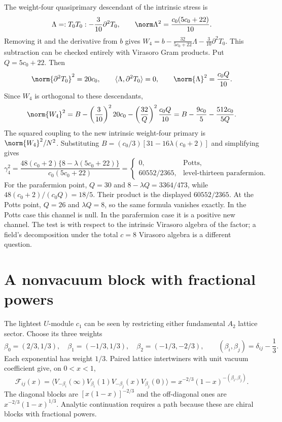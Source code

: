 The weight-four quasiprimary descendant of the intrinsic stress is
\[
 \Lambda=:T_0T_0:-\frac3{10}\partial^2T_0,
 \qquad \norm\Lambda^2=\frac{c_0(5c_0+22)}{10}.
\]
Removing it and the derivative from $b$ gives
$W_4=b-\frac{32}{5c_0+22}\Lambda-\frac3{10}\partial^2T_0$.
This subtraction can be checked entirely with Virasoro Gram
products. Put $Q=5c_0+22$. Then
\[
 \norm{\partial^2T_0}^2=20c_0,\qquad
 \langle\Lambda,\partial^2T_0\rangle=0,\qquad
 \norm{\Lambda}^2=\frac{c_0Q}{10}.
\]
Since $W_4$ is orthogonal to these descendants,
\[
 \norm{W_4}^2
 =B-\left(\frac3{10}\right)^2 20c_0
   -\left(\frac{32}{Q}\right)^2\frac{c_0Q}{10}
 =B-\frac{9c_0}{5}-\frac{512c_0}{5Q}.
\]
The squared coupling to the new intrinsic weight-four primary is
$\norm{W_4}^2/N^2$. Substituting $B=(c_0/3)
[31-16\lambda(c_0+2)]$ and simplifying gives
\begin{equation}
 \gamma_4^2=
 \frac{48(c_0+2)\{8-\lambda(5c_0+22)\}}
      {c_0(5c_0+22)}
 =\begin{cases}
 0,&\text{Potts},\\
 60552/2365,&\text{level-thirteen parafermion}.
 \end{cases}
 \label{eq:corr-spin4-test}
\end{equation}
For the parafermion point, $Q=30$ and
$8-\lambda Q=3364/473$, while
$48(c_0+2)/(c_0Q)=18/5$. Their product is the displayed
$60552/2365$. At the Potts point, $Q=26$ and $\lambda Q=8$,
so the same formula vanishes exactly.
In the Potts case this channel is null. In the parafermion case
it is a positive new channel. The test is with respect to the
intrinsic Virasoro algebra of the factor; a field's decomposition
under the total $c=8$ Virasoro algebra is a different question.

\section{A nonvacuum block with fractional powers}

The lightest $U$-module $c_1$ can be seen by restricting either
fundamental $A_2$ lattice sector. Choose its three weights
\[
 \beta_0=(2/3,1/3),\quad\beta_1=(-1/3,1/3),\quad
 \beta_2=(-1/3,-2/3),
 \qquad(\beta_i,\beta_j)=\delta_{ij}-\frac13.
\]
Each exponential has weight $1/3$. Paired lattice intertwiners
with unit vacuum coefficient give, on $0<x<1$,
\begin{equation}
 \mathcal F_{ij}(x)=
 \langle V_{-\beta_i}(\infty)V_{\beta_i}(1)
              V_{-\beta_j}(x)V_{\beta_j}(0)\rangle
 =x^{-2/3}(1-x)^{-(\beta_i,\beta_j)}.
 \label{eq:corr-light-block}
\end{equation}
The diagonal blocks are $[x(1-x)]^{-2/3}$ and the off-diagonal
ones are $x^{-2/3}(1-x)^{1/3}$. Analytic continuation requires
a path because these are chiral blocks with fractional powers.


